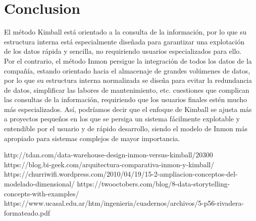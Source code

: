 \documentclass[preprint,12pt]{elsarticle}
\begin{document}
\section{Conclusion}
El método Kimball está orientado a la consulta de la información, por lo que su estructura interna está especialmente diseñada para garantizar una explotación de los datos rápida y sencilla, no requiriendo usuarios especializados para ello. Por el contrario, el método Inmon persigue la integración de todos los datos de la compañía, estando orientado hacia el almacenaje de grandes volúmenes de datos, por lo que su estructura interna normalizada se diseña para evitar la redundancia de datos, simplificar las labores de mantenimiento, etc. cuestiones que complican las consultas de la información, requiriendo que los usuarios finales estén mucho más especializados.
Así, podríamos decir que el enfoque de Kimball se ajusta más a proyectos pequeños en los que se persiga un sistema fácilmente explotable y entendible por el usuario y de rápido desarrollo, siendo el modelo de Inmon más apropiado para sistemas complejos de mayor importancia.

	
	

	
	
	\newpage
	
	   \begin{thebibliography}{0}
                  http://tdan.com/data-warehouse-design-inmon-versus-kimball/20300
                   https://blog.bi-geek.com/arquitectura-comparativa-inmon-y-kimball/
                   https://churriwifi.wordpress.com/2010/04/19/15-2-ampliacion-conceptos-del-modelado-dimensional/
                     https://twooctobers.com/blog/8-data-storytelling-concepts-with-examples/
                   https://www.ucasal.edu.ar/htm/ingenieria/cuadernos/archivos/5-p56-rivadera-formateado.pdf

         \end{thebibliography}
	
\end{document}
